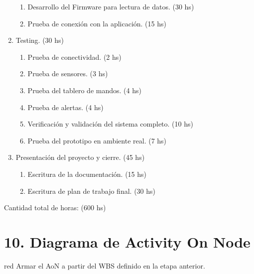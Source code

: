 \documentclass[
11pt, %
]{charter}
\begin{document}
\begin{enumerate}
\begin{enumerate}
	\item Desarrollo del Firmware para lectura de datos. (30 hs)
	\item Prueba de conexión con la aplicación. (15 hs)
	\end{enumerate}
\item Testing. (30 hs)
	\begin{enumerate}
	\item Prueba de conectividad. (2 hs)
	\item Prueba de sensores. (3 hs)
	\item Prueba del tablero de mandos. (4 hs)
	\item Prueba de alertas. (4 hs)
	\item Verificación y validación del sistema completo. (10 hs)
	\item Prueba del prototipo en ambiente real. (7 hs)
	\end{enumerate}
\item Presentación del proyecto y cierre. (45 hs)
	\begin{enumerate}
	\item Escritura de la documentación. (15 hs)
	\item Escritura de plan de trabajo final. (30 hs)
	\end{enumerate}
\end{enumerate}

Cantidad total de horas: (600 hs)

\section{10. Diagrama de Activity On Node}
\label{sec:AoN}

\begin{consigna}{red}
Armar el AoN a partir del WBS definido en la etapa anterior. 



\end{consigna}
\end{document}
